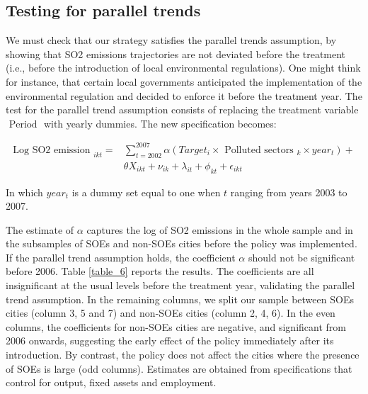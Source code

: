 \documentclass[12pt]{article}
\begin{document}
\subsection{Testing for parallel trends}

We must check that our strategy satisfies the parallel trends assumption, by showing that SO2 emissions trajectories are not deviated before the treatment (i.e., before the introduction of local environmental regulations). One might think for instance, that certain local governments anticipated the implementation of the environmental regulation and decided to enforce it before the treatment year. The test for the parallel trend assumption consists of replacing the treatment variable $\text { Period }$ with yearly dummies. The new specification becomes:

\begin{equation} \label{eq:equation_3}
\begin{aligned}
 \text {Log SO2 emission }_{i k t}= & \sum_{t=2002}^{2007} \alpha (Target_{i}  \times \text { Polluted sectors }_{k} \times year _{t}) + \\
 & \theta {X}_{i k t}+\nu_{ik}+\lambda_{it} +\phi_{kt} +\epsilon_{ikt}
 \end{aligned}
\end{equation}

In which $year_t$ is a dummy set equal to one when $t$ ranging from years 2003 to 2007. 


The estimate of $\alpha$ captures the log of SO2 emissions in the whole sample and in the subsamples of SOEs and non-SOEs cities before the policy was implemented. If the parallel trend assumption holds, the coefficient $\alpha$ should not be significant before 2006. Table \ref{table_6} reports the results. The coefficients are all insignificant at the usual levels before the treatment year, validating the parallel trend assumption. In the remaining columns, we split our sample between SOEs cities (column 3, 5 and 7) and non-SOEs cities (column 2, 4, 6). In the even columns, the coefficients for non-SOEs cities are negative, and significant from 2006 onwards, suggesting the early effect of the policy immediately after its introduction. By contrast, the policy does not affect the cities where the presence of SOEs is large (odd columns). Estimates are obtained from specifications that control for output, fixed assets and employment.
\end{document}
